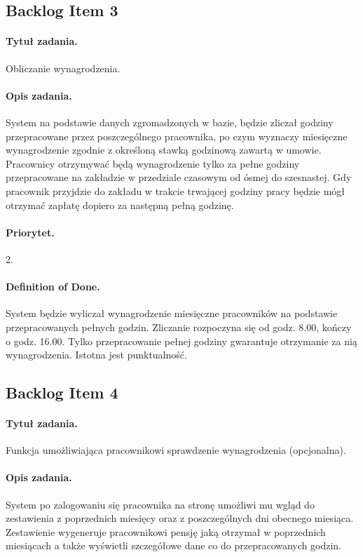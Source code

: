 \documentclass[a4paper]{article}
\begin{document}
\subsection{Backlog Item 3}
\paragraph{Tytuł zadania.} Obliczanie wynagrodzenia.
\paragraph{Opis zadania.} System na podstawie danych zgromadzonych w bazie, będzie zliczał godziny przepracowane przez poszczególnego pracownika, po czym wyznaczy miesięczne wynagrodzenie zgodnie z określoną stawką godzinową zawartą w umowie. Pracownicy otrzymywać będą wynagrodzenie tylko za pełne godziny przepracowane na zakładzie w przedziale czasowym od ósmej do szesnastej. Gdy pracownik przyjdzie do zakładu w trakcie trwającej godziny pracy będzie mógł otrzymać zapłatę dopiero za następną pełną godzinę.
\paragraph{Priorytet.} 2.
\paragraph{Definition of Done.} System będzie wyliczał wynagrodzenie miesięczne pracowników na podstawie przepracowanych pełnych godzin. Zliczanie rozpoczyna się od godz. 8.00, kończy o godz. 16.00. Tylko przepracowanie pełnej godziny gwarantuje otrzymanie za nią wynagrodzenia. Istotna jest punktualność.

\subsection{Backlog Item 4}
\paragraph{Tytuł zadania.} Funkcja umożliwiająca pracownikowi sprawdzenie wynagrodzenia (opcjonalna).
\paragraph{Opis zadania.} System po zalogowaniu się pracownika na stronę umożliwi mu wgląd do zestawienia z poprzednich miesięcy oraz z poszczególnych dni obecnego miesiąca. Zestawienie wygeneruje pracownikowi pensję jaką otrzymał w poprzednich miesiącach a także wyświetli szczegółowe dane co do przepracowanych godzin.
\end{document}
